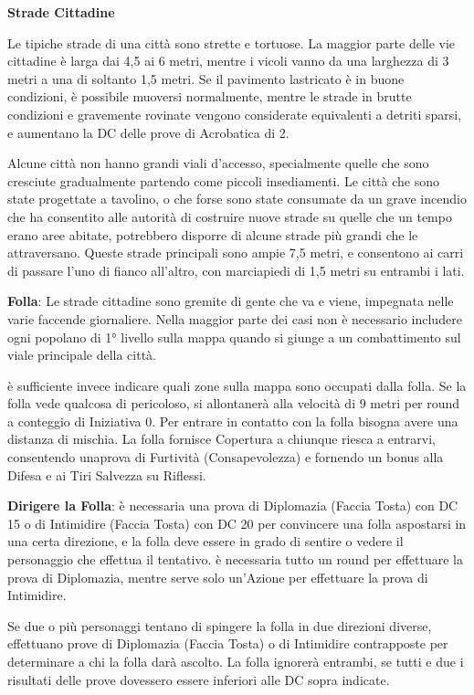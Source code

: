 \documentclass[a4paper,11pt,twoside,openany]{book}
\begin{document}
{\textbf{Strade Cittadine}

Le tipiche strade di una città sono strette e tortuose. La maggior parte delle vie cittadine è larga dai 4,5 ai 6 metri, mentre i vicoli vanno da una larghezza di 3 metri a una di soltanto 1,5 metri. Se il pavimento lastricato è in buone condizioni, è possibile muoversi normalmente, mentre le strade in brutte condizioni e gravemente rovinate vengono considerate equivalenti a detriti sparsi, e aumentano la DC delle prove di Acrobatica di 2.

Alcune città non hanno grandi viali d'accesso, specialmente quelle che sono cresciute gradualmente partendo come piccoli insediamenti. Le città che sono state progettate a tavolino, o che forse sono state consumate da un grave incendio che ha consentito alle autorità di costruire nuove strade su quelle che un tempo erano aree abitate, potrebbero disporre di alcune strade più grandi che le attraversano. Queste strade principali sono ampie 7,5 metri, e consentono ai carri di passare l'uno di fianco all'altro, con marciapiedi di 1,5 metri su entrambi i lati.

\textbf{Folla}: Le strade cittadine sono gremite di gente che va e viene, impegnata nelle varie faccende giornaliere. Nella maggior parte dei casi non è necessario includere ogni popolano di 1° livello sulla mappa quando si giunge a un combattimento sul viale principale della città.

è sufficiente invece indicare quali zone sulla mappa sono occupati dalla folla. Se la folla vede qualcosa di pericoloso, si allontanerà alla velocità di 9 metri per round a conteggio di Iniziativa 0. Per entrare in contatto con la folla bisogna avere una distanza di mischia. La folla fornisce Copertura a chiunque riesca a entrarvi, consentendo unaprova di Furtività (Consapevolezza) e fornendo un bonus alla Difesa e ai Tiri Salvezza su Riflessi.

\textbf{Dirigere la Folla}: è necessaria una prova di Diplomazia (Faccia Tosta) con DC 15 o di Intimidire (Faccia Tosta) con DC 20 per convincere una folla aspostarsi in una certa direzione, e la folla deve essere in grado di sentire o vedere il personaggio che effettua il tentativo. è necessaria tutto un round per effettuare la prova di Diplomazia, mentre serve solo un'Azione per effettuare la prova di Intimidire.

Se due o più personaggi tentano di spingere la folla in due direzioni diverse, effettuano prove di Diplomazia (Faccia Tosta) o di Intimidire contrapposte per determinare a chi la folla darà ascolto. La folla ignorerà entrambi, se tutti e due i risultati delle prove dovessero essere inferiori alle DC sopra indicate.

}
\end{document}

